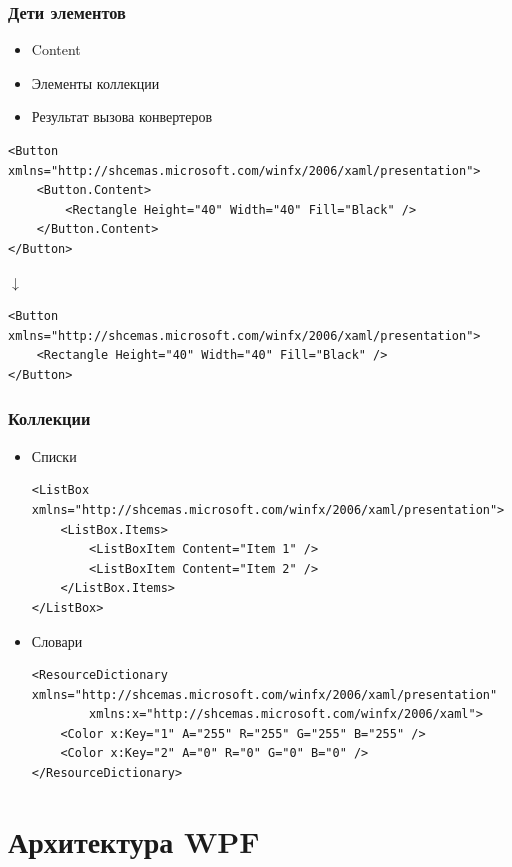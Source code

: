 \documentclass[xetex,mathserif,serif]{beamer}
\newcommand{\DownArrow} {
	\hspace{2cm}\begin{LARGE}$\downarrow$\end{LARGE}
}
\begin{document}
	\begin{frame}[fragile]
		\frametitle{Дети элементов}
		\begin{itemize}
			\item Content
			\item Элементы коллекции
			\item Результат вызова конвертеров
		\end{itemize}
		\vspace{3mm}
		\begin{scriptsize}
			\begin{verbatim}
<Button xmlns="http://shcemas.microsoft.com/winfx/2006/xaml/presentation">
    <Button.Content>
        <Rectangle Height="40" Width="40" Fill="Black" />
    </Button.Content>
</Button>
			\end{verbatim}

			\DownArrow
			\begin{verbatim}
<Button xmlns="http://shcemas.microsoft.com/winfx/2006/xaml/presentation">
    <Rectangle Height="40" Width="40" Fill="Black" />
</Button>
			\end{verbatim}
		\end{scriptsize}
	\end{frame}

	\begin{frame}[fragile]
		\frametitle{Коллекции}
		\begin{scriptsize}
			\begin{itemize}
				\item Списки
					\begin{verbatim}
<ListBox xmlns="http://shcemas.microsoft.com/winfx/2006/xaml/presentation">
    <ListBox.Items>
        <ListBoxItem Content="Item 1" />
        <ListBoxItem Content="Item 2" />
    </ListBox.Items>
</ListBox>
					\end{verbatim}
				\item Словари
					\begin{verbatim}
<ResourceDictionary xmlns="http://shcemas.microsoft.com/winfx/2006/xaml/presentation"
        xmlns:x="http://shcemas.microsoft.com/winfx/2006/xaml">
    <Color x:Key="1" A="255" R="255" G="255" B="255" />
    <Color x:Key="2" A="0" R="0" G="0" B="0" />
</ResourceDictionary>
					\end{verbatim}
			\end{itemize}
		\end{scriptsize}
	\end{frame}

	\section{Архитектура WPF}
\end{document}
